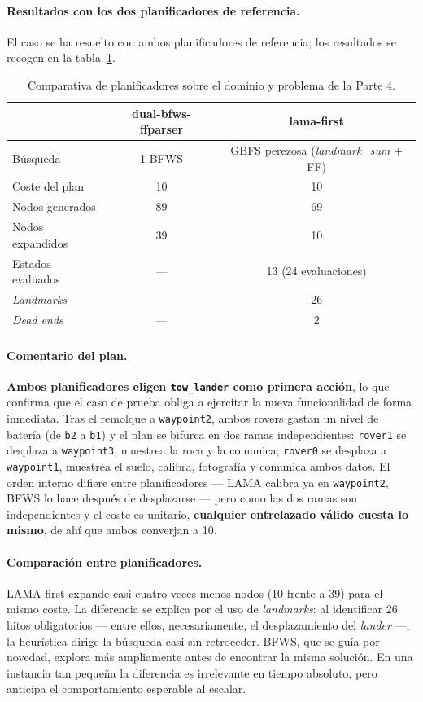 \documentclass[12pt,a4paper]{article}
\begin{document}
\paragraph{Resultados con los dos planificadores de referencia.}
El caso se ha resuelto con ambos planificadores de referencia; los resultados
se recogen en la tabla~\ref{tab:parte4}.

\begin{table}[H]
\centering
\caption{Comparativa de planificadores sobre el dominio y problema de la
Parte 4.}
\label{tab:parte4}
\small
\begin{tabular}{lcc}
\toprule
 & \textbf{dual-bfws-ffparser} & \textbf{lama-first} \\
\midrule
B\'usqueda      & 1-BFWS & GBFS perezosa (\emph{landmark\_sum} + FF) \\
Coste del plan & 10 & 10 \\
Nodos generados & 89 & 69 \\
Nodos expandidos & 39 & 10 \\
Estados evaluados & --- & 13 (24 evaluaciones) \\
\emph{Landmarks} & --- & 26 \\
\emph{Dead ends} & --- & 2 \\
\bottomrule
\end{tabular}
\end{table}

\paragraph{Comentario del plan.}
\textbf{Ambos planificadores eligen \texttt{tow\_lander} como primera
acci\'on}, lo que confirma que el caso de prueba obliga a ejercitar la nueva
funcionalidad de forma inmediata. Tras el remolque a \texttt{waypoint2},
ambos rovers gastan un nivel de bater\'ia (de \texttt{b2} a \texttt{b1}) y el
plan se bifurca en dos ramas independientes: \texttt{rover1} se desplaza a
\texttt{waypoint3}, muestrea la roca y la comunica; \texttt{rover0} se
desplaza a \texttt{waypoint1}, muestrea el suelo, calibra, fotograf\'ia y
comunica ambos datos. El orden interno difiere entre planificadores --- LAMA
calibra ya en \texttt{waypoint2}, BFWS lo hace despu\'es de desplazarse ---
pero como las dos ramas son independientes y el coste es unitario,
\textbf{cualquier entrelazado v\'alido cuesta lo mismo}, de ah\'i que ambos
converjan a 10.

\paragraph{Comparaci\'on entre planificadores.}
LAMA-first expande casi cuatro veces menos nodos (10 frente a 39) para el
mismo coste. La diferencia se explica por el uso de \emph{landmarks}: al
identificar 26 hitos obligatorios --- entre ellos, necesariamente, el
desplazamiento del \emph{lander} ---, la heur\'istica dirige la b\'usqueda
casi sin retroceder. BFWS, que se gu\'ia por novedad, explora m\'as ampliamente
antes de encontrar la misma soluci\'on. En una instancia tan peque\~na la
diferencia es irrelevante en tiempo absoluto, pero anticipa el comportamiento
esperable al escalar.
\end{document}
